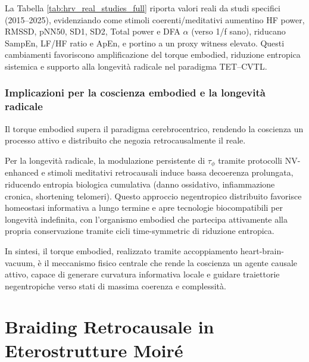 \documentclass[11pt,a4paper]{article}
\let\oldref\ref
\renewcommand{\ref}{\protect\oldref}
\theoremstyle{plain}
\theoremstyle{definition}
\begin{document}
La Tabella \ref{tab:hrv_real_studies_full} riporta valori reali da studi specifici (2015–2025), evidenziando come stimoli coerenti/meditativi aumentino HF power, RMSSD, pNN50, SD1, SD2, Total power e DFA $\alpha$ (verso 1/f sano), riducano SampEn, LF/HF ratio e ApEn, e portino a un proxy witness elevato. Questi cambiamenti favoriscono amplificazione del torque embodied, riduzione entropica sistemica e supporto alla longevità radicale nel paradigma TET–CVTL.







\subsubsection{Implicazioni per la coscienza embodied e la longevità radicale}

Il torque embodied supera il paradigma cerebrocentrico, rendendo la coscienza un processo attivo e distribuito che negozia retrocausalmente il reale. 

\vspace{0.2cm}

Per la longevità radicale, la modulazione persistente di $\tau_\phi$ tramite protocolli NV-enhanced e stimoli meditativi retrocausali induce bassa decoerenza prolungata, riducendo entropia biologica cumulativa (danno ossidativo, infiammazione cronica, shortening telomeri). Questo approccio negentropico distribuito favorisce homeostasi informativa a lungo termine e apre tecnologie biocompatibili per longevità indefinita, con l'organismo embodied che partecipa attivamente alla propria conservazione tramite cicli time-symmetric di riduzione entropica.


\vspace{0.2cm}

In sintesi, il torque embodied, realizzato tramite accoppiamento heart-brain-vacuum, è il meccanismo fisico centrale che rende la coscienza un agente causale attivo, capace di generare curvatura informativa locale e guidare traiettorie negentropiche verso stati di massima coerenza e complessità.





\vspace{0.4cm}





\section{Braiding Retrocausale in Eterostrutture Moiré}
\end{document}
